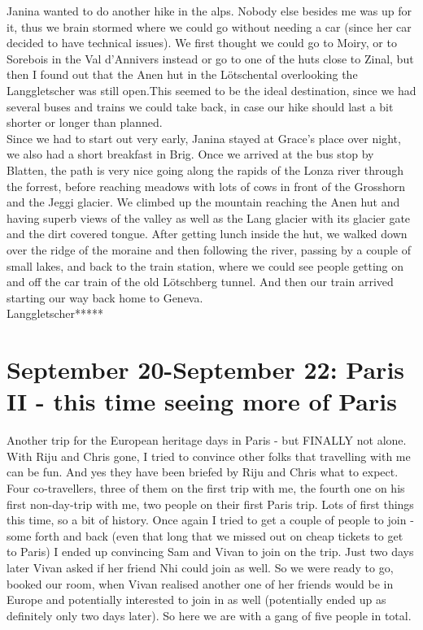 Janina wanted to do another hike in the alps. Nobody else besides me was up for it, thus we brain stormed where we could go without needing a car (since her car decided to have technical issues). We first thought we could go to Moiry, or to Sorebois in the Val d'Annivers instead or go to one of the huts close to Zinal, but then I found out that the Anen hut in the L\"otschental overlooking the Langgletscher was still open.This seemed to be the ideal destination, since we had several buses and trains we could take back, in case our hike should last a bit shorter or longer than planned.\\
Since we had to start out very early, Janina stayed at Grace's place over night, we also had a short breakfast in Brig. Once we arrived at the bus stop by Blatten, the path is very nice going along the rapids of the Lonza river through the forrest, before reaching meadows with lots of cows in front of the Grosshorn and the Jeggi glacier. We climbed up the mountain reaching the Anen hut and having superb views of the valley as well as the Lang glacier with its glacier gate and the dirt covered tongue. After getting lunch inside the hut, we walked down over the ridge of the moraine and then following the river, passing by a couple of small lakes, and back to the train station, where we could see people getting on and off the car train of the old L\"otschberg tunnel. And then our train arrived starting our way back home to Geneva.\\

Langgletscher*****

\section{September 20-September 22: Paris II - this time seeing more of Paris}
\label{2019:Paris II}

Another trip for the European heritage days in Paris - but FINALLY not alone. With Riju and Chris gone, I tried to convince other folks that travelling with me can be fun. And yes they have been briefed by Riju and Chris what to expect. Four co-travellers, three of them on the first trip with me, the fourth one on his first non-day-trip with me, two people on their first Paris trip. Lots of first things this time, so a bit of history. Once again I tried to get a couple of people to join - some forth and back (even that long that we missed out on cheap tickets to get to Paris) I ended up convincing Sam and Vivan to join on the trip. Just two days later Vivan asked if her friend Nhi could join as well. So we were ready to go, booked our room, when Vivan realised another one of her friends would be in Europe and potentially interested to join in as well (potentially ended up as definitely only two days later). So here we are with a gang of five people in total.\\

